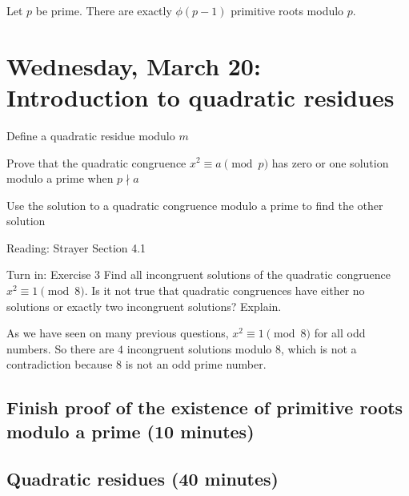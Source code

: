\documentclass[letterpaper, 11 pt]{ximera}
\theoremstyle{definition}
\begin{document}
\begin{cor*}[Corollary 5.10]\label{cor:number-prime-roots}
    Let $p$ be prime. There are exactly $\phi(p-1)$ primitive roots modulo $p.$
\end{cor*}


\section{Wednesday, March 20: Introduction to quadratic residues}

\begin{obj}
    \item Define a quadratic residue modulo $m$
    \item Prove that the quadratic congruence $x^2\equiv a\pmod{p}$ has zero or one solution modulo a prime when $p\nmid a$
    \item Use the solution to a quadratic congruence modulo a prime to find the other solution
\end{obj}


\begin{pre}
    \item[Reading:] Strayer Section 4.1
    \item[Turn in:] Exercise 3
     Find all incongruent solutions of the quadratic congruence $x^2\equiv 1\pmod{8}.$ Is it not true that quadratic congruences have either no solutions or exactly two incongruent solutions? Explain.

     \begin{solution}
        As we have seen on many previous questions, $x^2\equiv 1\pmod{8}$ for all odd numbers. So there are $4$ incongruent solutions modulo $8$, which is not a contradiction because $8$ is not an odd prime number.
     \end{solution}
\end{pre}

\subsection{Finish proof of the existence of primitive roots modulo a prime (10 minutes)}

\subsection{Quadratic residues (40 minutes)}
\end{document}
